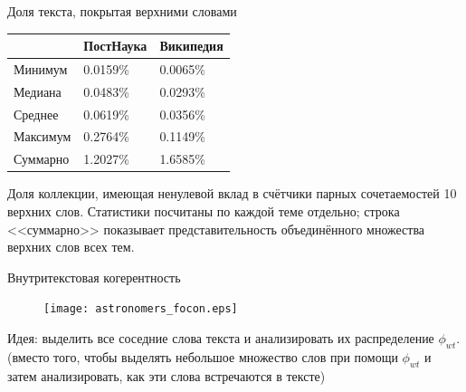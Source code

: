 \begin{frame}{Доля текста, покрытая верхними словами}

\begin{table}[ht]
\begin{tabular}{|l|l|l|} \hline
         & ПостНаука & Википедия \\ \hline
Минимум  & 0.0159\%  & 0.0065\%  \\ \hline
Медиана  & 0.0483\%  & 0.0293\%  \\ \hline
Среднее  & 0.0619\%  & 0.0356\%  \\ \hline
Максимум & 0.2764\%  & 0.1149\%  \\ \hline
Суммарно & 1.2027\%  & 1.6585\%  \\ \hline
\end{tabular}
\end{table}
      Доля коллекции, имеющая ненулевой вклад в счётчики парных сочетаемостей 10 верхних слов. Статистики посчитаны по каждой теме отдельно; строка <<суммарно>> показывает представительность объединённого множества верхних слов всех тем.
\end{frame}


\begin{frame}{Внутритекстовая когерентность}

\begin{figure}
    \centering
    \texttt{[image: astronomers\_focon.eps]} %
\end{figure}

Идея: выделить все соседние слова текста и анализировать их распределение $\phi_{wt}$.\\
\medskip
(вместо того, чтобы выделять небольшое множество слов при помощи $\phi_{wt}$ и затем анализировать, как эти слова встречаются в тексте)

\end{frame}

